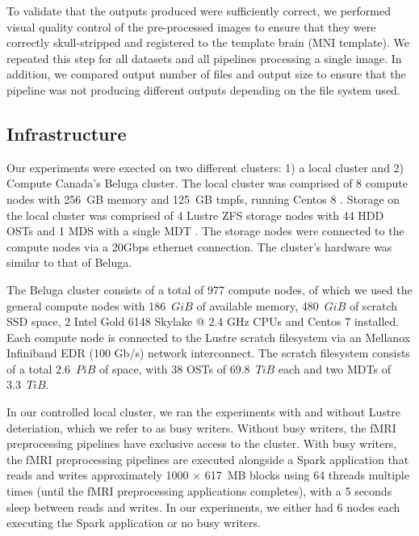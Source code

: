     
    To validate that the outputs produced were sufficiently correct, we
    performed visual quality control of the pre-processed images to ensure
    that they were correctly skull-stripped and registered to the template
    brain (MNI template). We repeated this step for all datasets and all
    pipelines processing a single image. In addition, we compared output
    number of files and output size to ensure that the pipeline was not
    producing different outputs depending on the file system used.
    
    
    \subsection{Infrastructure}
    

    Our experiments were exected on two different clusters: 1) a local cluster and 2) Compute Canada's Beluga cluster.
    The local cluster was comprised of 8 compute nodes with 256~GB memory and 125~GB tmpfs, running Centos 8 .
     Storage on the local
    cluster was comprised of 4 Lustre ZFS storage nodes with 44 HDD OSTs and 1 MDS with a single MDT . The
    storage nodes were connected to the compute nodes via a 20Gbps ethernet connection.
    The cluster's hardware was similar to that of Beluga.
    
    The Beluga cluster consists of a total of 977 compute nodes, of which we used the  general compute nodes with 186~$GiB$ of available
    memory, 480~$GiB$ of scratch SSD space, 2 Intel Gold 6148 Skylake @ 2.4 GHz CPUs and Centos 7 installed. Each compute node is connected
    to the Lustre scratch filesystem via an Mellanox Infiniband EDR (100 Gb/s) network interconnect. The scratch filesystem consists of a total 2.6~$PiB$
    of space, with 38 OSTs of 69.8~$TiB$ each and two MDTs of 3.3~$TiB$.


    In our controlled local cluster, we ran the experiments with and without Lustre deteriation, which we refer to as busy writers. Without
    busy writers, the fMRI preprocessing pipelines have exclusive access to the cluster. With busy writers, the fMRI preprocessing pipelines are executed alongside
    a Spark application that reads and writes approximately 1000 $\times$ 617~MB blocks using 64 threads multiple times (until the fMRI preprocessing applications completes),
    with a 5 seconds sleep between reads and writes. In our experiments, we either had 6 nodes each executing the Spark application or no busy writers.

